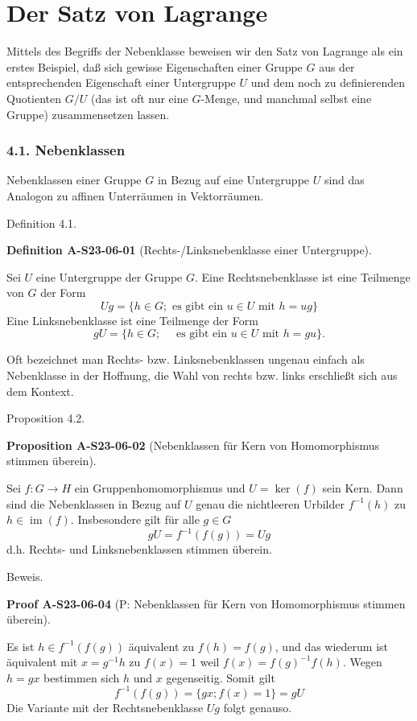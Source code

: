 \documentclass[10pt, letterpaper]{article}
\newcommand{\CustomHeading}[3]{%
  \par\medskip\noindent%
  \textbf{#1 #2} \textnormal{(#3)}.\enskip%
}
\newenvironment{DEF}[2]{\begin{unitbox}\CustomHeading{Definition}{#1}{#2}}{\end{unitbox}}
\newenvironment{PROP}[2]{\begin{unitbox}\CustomHeading{Proposition}{#1}{#2}}{\end{unitbox}}
\newenvironment{PROOF}[2]{\begin{unitbox}\CustomHeading{Proof}{#1}{#2}}{\end{unitbox}}
\begin{document}
\pagebreak


\section*{Der Satz von Lagrange}


Mittels des Begriffs der Nebenklasse beweisen wir den Satz von Lagrange als ein erstes Beispiel, daß sich gewisse Eigenschaften einer Gruppe $G$ aus der entsprechenden Eigenschaft einer Untergruppe $U$ und dem noch zu definierenden Quotienten $G / U$ (das ist oft nur eine $G$-Menge, und manchmal selbst eine Gruppe) zusammensetzen lassen.\\



\subsubsection{4.1. Nebenklassen} 


Nebenklassen einer Gruppe $G$ in Bezug auf eine Untergruppe $U$ sind das Analogon zu affinen Unterräumen in Vektorräumen.

Definition 4.1. 


\begin{DEF}{A-S23-06-01}{Rechts-/Linksnebenklasse einer Untergruppe}
Sei $U$ eine Untergruppe der Gruppe $G$. Eine Rechtsnebenklasse ist eine Teilmenge von $G$ der Form
$$
U g=\{h \in G ; \text { es gibt ein } u \in U \text { mit } h=u g\}
$$
Eine Linksnebenklasse ist eine Teilmenge der Form
$$
g U=\{h \in G ; \quad \text { es gibt ein } u \in U \text { mit } h=g u\} .
$$
\end{DEF}


Oft bezeichnet man Rechts- bzw. Linksnebenklassen ungenau einfach als Nebenklasse in der Hoffnung, die Wahl von rechts bzw. links erschließt sich aus dem Kontext.

Proposition 4.2. 


\begin{PROP}{A-S23-06-02}{Nebenklassen für Kern von Homomorphismus stimmen überein}
Sei $f: G \rightarrow H$ ein Gruppenhomomorphismus und $U=\operatorname{ker}(f)$ sein Kern. Dann sind die Nebenklassen in Bezug auf $U$ genau die nichtleeren Urbilder $f^{-1}(h)$ zu $h \in \operatorname{im}(f)$. Insbesondere gilt für alle $g \in G$
$$
g U=f^{-1}(f(g))=U g
$$
d.h. Rechts- und Linksnebenklassen stimmen überein.
\end{PROP}


Beweis. 


\begin{PROOF}{A-S23-06-04}{P: Nebenklassen für Kern von Homomorphismus stimmen überein}
Es ist $h \in f^{-1}(f(g))$ äquivalent zu $f(h)=f(g)$, und das wiederum ist äquivalent mit $x=g^{-1} h$ zu $f(x)=1$ weil $f(x)=f(g)^{-1} f(h)$. Wegen $h=g x$ bestimmen sich $h$ und $x$ gegenseitig. Somit gilt
$$
f^{-1}(f(g))=\{g x ; f(x)=1\}=g U
$$
Die Variante mit der Rechtsnebenklasse $U g$ folgt genauso.
\end{PROOF}
\end{document}
